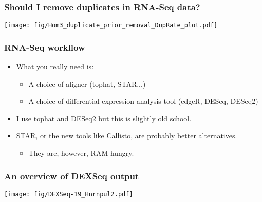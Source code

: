 \documentclass{beamer}
\begin{document}
\begin{frame}
  \frametitle{Should I remove duplicates in RNA-Seq data?}
  \begin{center}
    \texttt{[image: fig/Hom3\_duplicate\_prior\_removal\_DupRate\_plot.pdf]}
  \end{center}
\end{frame}


\begin{frame}
  \frametitle{RNA-Seq workflow}
  \begin{itemize}
  \item What you really need is:
    \begin{itemize}
    \item A choice of aligner (tophat, STAR...)
    \item A choice of differential expression analysis tool (edgeR, DESeq, DESeq2)
    \end{itemize}
  \item I use tophat and DESeq2 but this is slightly old school.
  \item STAR, or the new tools like Callisto, are probably better alternatives.
    \begin{itemize}
    \item They are, however, RAM hungry.
    \end{itemize}
  \end{itemize}
\end{frame}

\begin{frame}
  \frametitle{An overview of DEXSeq output}
  \begin{center}
    \texttt{[image: fig/DEXSeq-19\_Hnrnpul2.pdf]}
  \end{center}
\end{frame}
\end{document}
